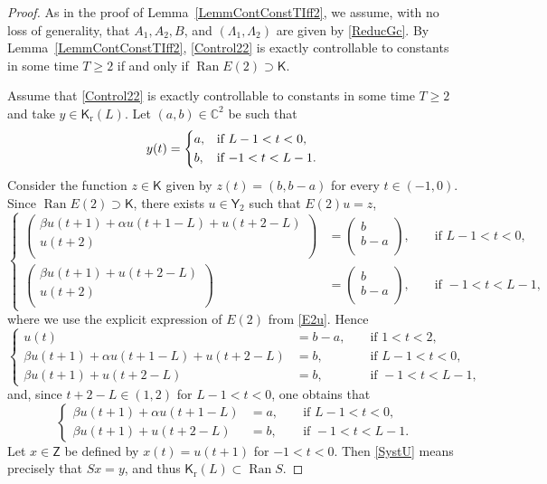 \documentclass[JEP,XML,SOM,Unicode]{cedram}
\theoremstyle{plain}
\theoremstyle{definition}
\DeclareMathOperator{\range}{Ran}
\begin{document}
\begin{proof}
As in the proof of Lemma~\ref{LemmContConstTIff2}, we assume, with no loss of generality, that $A_1, A_2, B$, and $(\Lambda_1, \Lambda_2)$ are given by \eqref{ReducGc}. By Lemma~\ref{LemmContConstTIff2}, \eqref{Control22} is exactly controllable to constants in some time $T \geq 2$ if and only if $\range E(2) \supset \mathsf K$.

Assume that \eqref{Control22} is exactly controllable to constants in some time $T \geq 2$ and take $y \in \mathsf K_{\mathrm r}(L)$. Let $(a, b) \in \mathbb C^2$ be such that
\[
y(t) = \begin{dcases*}
a, & if $L - 1 < t < 0$, \\
b, & if $-1 < t < L - 1$.
\end{dcases*}
\]
Consider the function $z \in \mathsf K$ given by $z(t) = (b, b - a)$ for every $t \in (-1, 0)$. Since $\range E(2) \supset \mathsf K$, there exists $u \in \mathsf Y_2$ such that $E(2) u = z$, \ie 
\[
\left\{
\begin{aligned}
\begin{pmatrix}
\beta u(t + 1) + \alpha u(t + 1 - L) + u(t + 2 - L) \\
u(t + 2) \\
\end{pmatrix} & = \begin{pmatrix}
b \\
b - a \\
\end{pmatrix}, & & \text{ if } L - 1 < t < 0, \\
\begin{pmatrix}
\beta u(t + 1) + u(t + 2 - L) \\
u(t + 2) \\
\end{pmatrix} & = \begin{pmatrix}
b \\
b - a \\
\end{pmatrix}, & & \text{ if } -1 < t < L - 1,
\end{aligned}
\right.
\]
where we use the explicit expression of $E(2)$ from \eqref{E2u}. Hence
\[
\left\{
\begin{aligned}
u(t) & = b - a, & & \text{ if } 1 < t < 2, \\
\beta u(t + 1) + \alpha u(t + 1 - L) + u(t + 2 - L) & = b, & & \text{ if } L - 1 < t < 0, \\
\beta u(t + 1) + u(t + 2 - L) & = b, & & \text{ if } -1 < t < L - 1,
\end{aligned}
\right.
\]
and, since $t + 2 - L \in (1, 2)$ for $L - 1 < t < 0$, one obtains that
\begin{equation}
\label{SystU}
\left\{
\begin{aligned}
\beta u(t + 1) + \alpha u(t + 1 - L) & = a, & & \text{ if } L - 1 < t < 0, \\
\beta u(t + 1) + u(t + 2 - L) & = b, & & \text{ if } -1 < t < L - 1.
\end{aligned}
\right.
\end{equation}
Let $x \in \mathsf Z$ be defined by $x(t) = u(t + 1)$ for $-1 < t < 0$. Then \eqref{SystU} means precisely that $S x = y$, and thus $\mathsf K_{\mathrm r}(L) \subset \range S$.


\end{proof}
\end{document}
